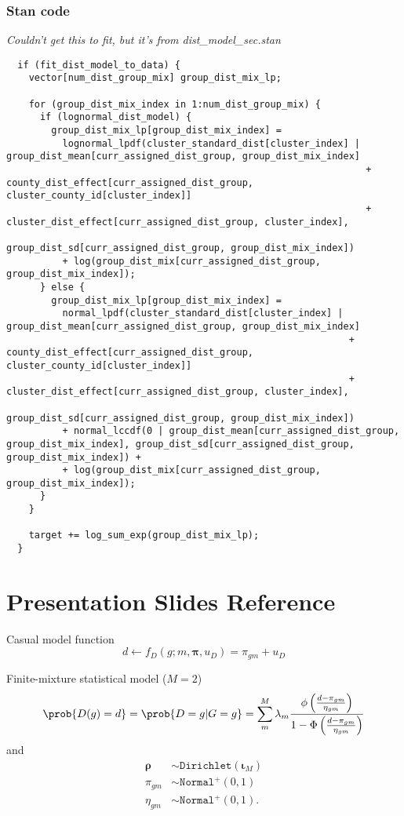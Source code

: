 \documentclass{article}
\begin{document}
\subsubsection*{Stan code}
\textit{Couldn't get this to fit, but it's from dist\_model\_sec.stan}
\begin{lstlisting}
  if (fit_dist_model_to_data) {
    vector[num_dist_group_mix] group_dist_mix_lp;
    
    for (group_dist_mix_index in 1:num_dist_group_mix) {
      if (lognormal_dist_model) {
        group_dist_mix_lp[group_dist_mix_index] =
          lognormal_lpdf(cluster_standard_dist[cluster_index] | group_dist_mean[curr_assigned_dist_group, group_dist_mix_index] 
                                                                + county_dist_effect[curr_assigned_dist_group, cluster_county_id[cluster_index]] 
                                                                + cluster_dist_effect[curr_assigned_dist_group, cluster_index],
                                                                group_dist_sd[curr_assigned_dist_group, group_dist_mix_index])
          + log(group_dist_mix[curr_assigned_dist_group, group_dist_mix_index]); 
      } else {
        group_dist_mix_lp[group_dist_mix_index] = 
          normal_lpdf(cluster_standard_dist[cluster_index] | group_dist_mean[curr_assigned_dist_group, group_dist_mix_index] 
                                                             + county_dist_effect[curr_assigned_dist_group, cluster_county_id[cluster_index]] 
                                                             + cluster_dist_effect[curr_assigned_dist_group, cluster_index],
                                                             group_dist_sd[curr_assigned_dist_group, group_dist_mix_index])  
          + normal_lccdf(0 | group_dist_mean[curr_assigned_dist_group, group_dist_mix_index], group_dist_sd[curr_assigned_dist_group, group_dist_mix_index]) +
          + log(group_dist_mix[curr_assigned_dist_group, group_dist_mix_index]); 
      }
    }
    
    target += log_sum_exp(group_dist_mix_lp);
  }
\end{lstlisting}

\section*{Presentation Slides Reference}
 Casual model function 
 \begin{equation*}  
   d \leftarrow f_D(g; m, \boldsymbol{\pi}, u_D) = \pi_{gm} + u_D 
 \end{equation*} 


 Finite-mixture statistical model ($M = 2$) 
 \begin{align*} 
 \prob{D(g) = d} = \prob{D = g | G = g} = \sum_m^M \lambda_m \frac{\phi\left(\frac{d - \pi_{gm}}{\eta_{gm}}\right)}{1 - \Phi\left(\frac{d - \pi_{gm}}{\eta_{gm}}\right)}  
 \end{align*} 
 and 
 \begin{align*} 
   \boldsymbol{\rho} &\sim \mathtt{Dirichlet}(\boldsymbol{\iota}_M) \\ 
   \pi_{gm} &\sim \mathtt{Normal^+}(0, 1) \\ 
   \eta_{gm} &\sim \mathtt{Normal^+}(0, 1). 
 \end{align*} 
\end{document}
